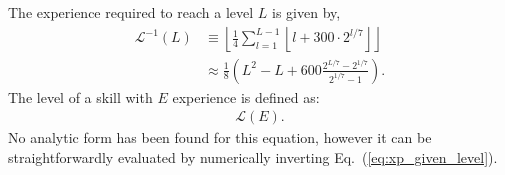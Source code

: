 The experience required to reach a level $L$ is given by,
\begin{align}\label{eq:xp_given_level}
	\mathcal{L}^{-1}(L) &\equiv \left \lfloor \frac{1}{4} \sum_{l=1}^{L-1} \left \lfloor l + 300\cdot2^{l/7} \right \rfloor \right\rfloor\\
	&\approx \frac{1}{8}\left( L^2 - L + 600\frac{2^{L/7} - 2^{1/7}}{2^{1/7}-1}\right).
\end{align}
The level of a skill with $E$ experience is defined as:
\begin{align}\label{eq:level_given_xp}
	\mathcal{L}(E).
\end{align}
No analytic form has been found for this equation, however it can be straightforwardly evaluated by numerically inverting Eq.~(\ref{eq:xp_given_level}).